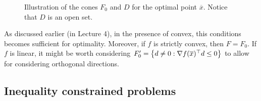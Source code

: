 \begin{figure}
	\caption{Illustration of the cones $F_0$ and $D$ for the optimal point $\overline{x}$. Notice that $D$ is an open set.} \label{cones_F0_D}
\end{figure}

As discussed earlier (in Lecture 4), in the presence of convex, this conditions becomes sufficient for optimality. Moreover, if $f$ is strictly convex, then $F = F_0$. If $f$ is linear, it might be worth considering $F_0' = \left\{ d \neq 0 : \nabla f (\overline{x})^\top d \leq 0 \right \}$ to allow for considering orthogonal directions.

\subsection{Inequality constrained problems}

